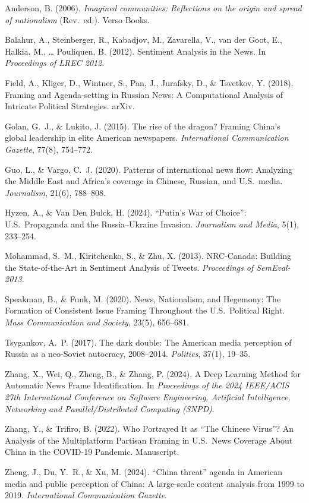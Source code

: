 \documentclass[12pt]{article}
\begin{document}
\clearpage
\begin{thebibliography}{99}
Anderson, B. (2006). \textit{Imagined communities: Reflections on the origin and spread of nationalism} (Rev.\ ed.). Verso Books.

Balahur, A., Steinberger, R., Kabadjov, M., Zavarella, V., van der Goot, E., Halkia, M., … Pouliquen, B. (2012). Sentiment Analysis in the News. In \textit{Proceedings of LREC 2012}.

Field, A., Kliger, D., Wintner, S., Pan, J., Jurafsky, D., \& Tsvetkov, Y. (2018). Framing and Agenda-setting in Russian News: A Computational Analysis of Intricate Political Strategies. arXiv.

Golan, G.\ J., \& Lukito, J. (2015). The rise of the dragon? Framing China’s global leadership in elite American newspapers. \textit{International Communication Gazette}, 77(8), 754–772.

Guo, L., \& Vargo, C.\ J. (2020). Patterns of international news flow: Analyzing the Middle East and Africa’s coverage in Chinese, Russian, and U.S.\ media. \textit{Journalism}, 21(6), 788–808.

Hyzen, A., \& Van Den Bulck, H. (2024). “Putin’s War of Choice”: U.S.\ Propaganda and the Russia–Ukraine Invasion. \textit{Journalism and Media}, 5(1), 233–254.

Mohammad, S.\ M., Kiritchenko, S., \& Zhu, X. (2013). NRC-Canada: Building the State-of-the-Art in Sentiment Analysis of Tweets. \textit{Proceedings of SemEval-2013}.

Speakman, B., \& Funk, M. (2020). News, Nationalism, and Hegemony: The Formation of Consistent Issue Framing Throughout the U.S.\ Political Right. \textit{Mass Communication and Society}, 23(5), 656–681.

Tsygankov, A.\ P. (2017). The dark double: The American media perception of Russia as a neo-Soviet autocracy, 2008–2014. \textit{Politics}, 37(1), 19–35.

Zhang, X., Wei, Q., Zheng, B., \& Zhang, P. (2024). A Deep Learning Method for Automatic News Frame Identification. In \textit{Proceedings of the 2024 IEEE/ACIS 27th International Conference on Software Engineering, Artificial Intelligence, Networking and Parallel/Distributed Computing (SNPD)}.

Zhang, Y., \& Trifiro, B. (2022). Who Portrayed It as “The Chinese Virus”? An Analysis of the Multiplatform Partisan Framing in U.S.\ News Coverage About China in the COVID-19 Pandemic. Manuscript.

Zheng, J., Du, Y.\ R., \& Xu, M. (2024). “China threat” agenda in American media and public perception of China: A large-scale content analysis from 1999 to 2019. \textit{International Communication Gazette}.
\end{thebibliography}
\end{document}
